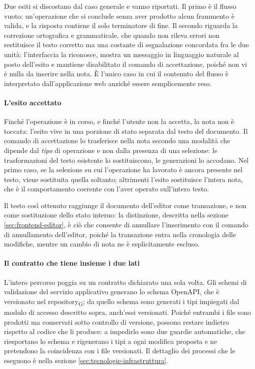 \documentclass[a4paper, 10pt]{article}
\begin{document}
Due esiti si discostano dal caso generale e vanno riportati. Il primo è il flusso vuoto: un'operazione che si conclude senza aver prodotto alcun frammento è valida, e la risposta contiene il solo terminatore di fine. Il secondo riguarda la correzione ortografica e grammaticale, che quando non rileva errori non restituisce il testo corretto ma una costante di segnalazione concordata fra le due unità: l'interfaccia la riconosce, mostra un messaggio in linguaggio naturale al posto dell'esito e mantiene disabilitato il comando di accettazione, poiché non vi è nulla da inserire nella nota. È l'unico caso in cui il contenuto del flusso è interpretato dall'applicazione web anziché essere semplicemente reso.

\paragraph{L'esito accettato}
Finché l'operazione è in corso, e finché l'utente non la accetta, la nota non è toccata: l'esito vive in una porzione di stato separata dal testo del documento. Il comando di accettazione lo trasferisce nella nota secondo una modalità che dipende dal \textit{tipo} di operazione e non dalla presenza di una selezione: le trasformazioni del testo esistente lo sostituiscono, le generazioni lo accodano. Nel primo caso, se la selezione su cui l'operazione ha lavorato è ancora presente nel testo, viene sostituita quella soltanto; altrimenti l'esito sostituisce l'intera nota, che è il comportamento coerente con l'aver operato sull'intero testo.

Il testo così ottenuto raggiunge il documento dell'editor come transazione, e non come sostituzione dello stato interno: la distinzione, descritta nella sezione \ref{sec:frontend-editor}, è ciò che consente di annullare l'inserimento con il comando di annullamento dell'editor, poiché la transazione entra nella cronologia delle modifiche, mentre un cambio di nota ne è esplicitamente escluso.

\paragraph{Il contratto che tiene insieme i due lati}
L'intero percorso poggia su un contratto dichiarato una sola volta. Gli schemi di validazione del servizio applicativo generano lo schema OpenAPI, che è versionato nel repository\textsubscript{G}; da quello schema sono generati i tipi impiegati dal modulo di accesso descritto sopra, anch'essi versionati. Poiché entrambi i file sono prodotti ma conservati sotto controllo di versione, possono restare indietro rispetto al codice che li produce: a impedirlo sono due guardie automatiche, che riesportano lo schema e rigenerano i tipi a ogni modifica proposta e ne pretendono la coincidenza con i file versionati. Il dettaglio dei processi che le eseguono è nella sezione \ref{sec:tecnologie-infrastruttura}.
\end{document}
